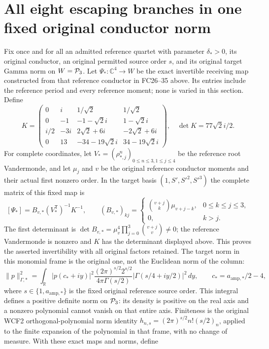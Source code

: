 \documentclass[11pt]{article}
\newcommand{\C}{\mathbb C}
\begin{document}
\section{All eight escaping branches in one fixed original conductor norm}
Fix once and for all an admitted reference quartet with parameter
$\delta_*>0$, its original conductor, an original permitted source
order $s$, and its original target Gamma norm on $W=\mathcal P_3$.
Let $\Psi_*:\C^4\to W$ be the exact invertible receiving map
constructed from that reference conductor in FC26--35
above. Its entries include the reference period and every
reference moment; none is varied in this section. Define
\[
 K=\begin{pmatrix}
 0&i&1/\sqrt2&1/\sqrt2\\
 0&-1&-1-\sqrt2 i&1-\sqrt2 i\\
 i/2&-3i&2\sqrt2+6i&-2\sqrt2+6i\\
 0&13&-34-19\sqrt2 i&34-19\sqrt2 i
 \end{pmatrix},\quad \det K=77\sqrt2 i/2.
\]
For complete coordinates, let $V_*=(\rho_{*,j}^n)_{0\le n\le3,1\le j\le4}$
be the reference root Vandermonde, and let $\mu_j$ and $v$ be
the original reference conductor moments and their actual first
nonzero order. In the target basis $(1,S',S'^2,S'^3)$ the complete
matrix of this fixed map is
\[
 [\Psi_*]=B_{v,*}(V_*^{\mathsf T})^{-1}K^{-1},\qquad
 (B_{v,*})_{kj}=\begin{cases}
 \binom{v+j}{k}\mu_{v+j-k},&0\le k\le j\le3,\\
 0,&k>j.
 \end{cases}
\]
The first determinant is
$\det B_{v,*}=\mu_v^4\prod_{j=0}^3\binom{v+j}{v}\ne0$;
the reference Vandermonde is nonzero and $K$ has the determinant
displayed above. This proves the asserted invertibility with all
original factors retained. The target norm in this monomial frame
is the original one, not the Euclidean norm of the column:
\[
 \|p\|_{\Gamma,*}^2=
 \int_{\mathbb R}|p(c_*+iy)|^2
 \frac{(2\pi)^{s/2}2^{s/2}}{4\pi\Gamma(s/2)}
 |\Gamma(s/4+iy/2)|^2\,dy,\qquad
 c_*=a_{\mathrm{amp},*}/2-4,
\]
where $s\in\{1,a_{\mathrm{amp},*}\}$ is the fixed original
reference source order. This integral defines a positive definite
norm on $\mathcal P_3$: its density is positive on the real axis and a
nonzero polynomial cannot vanish on that entire axis. Finiteness is
the original WCF2 orthogonal-polynomial norm identity
$h_{n,s}=(2\pi)^{s/2}n!(s/2)_n$, applied to the finite expansion
of the polynomial in that frame, with no change of measure.
With these exact maps and norms, define
\end{document}
